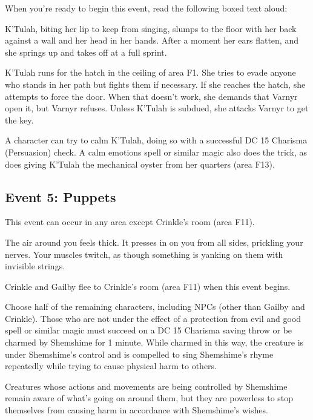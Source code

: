 \documentclass[10pt,a4paper,twoside,bg=print,twocolumn,openany,nodeprecatedcode]{dndbook}
\begin{document}
When you're ready to begin this event, read the following boxed text aloud:

\begin{DndReadAloud}{}
K'Tulah, biting her lip to keep from singing, slumps to the floor with her back against a wall and her head in her hands. After a moment her ears flatten, and she springs up and takes off at a full sprint.

\end{DndReadAloud}

K'Tulah runs for the hatch in the ceiling of area F1. She tries to evade anyone who stands in her path but fights them if necessary. If she reaches the hatch, she attempts to force the door. When that doesn't work, she demands that Varnyr open it, but Varnyr refuses. Unless K'Tulah is subdued, she attacks Varnyr to get the key.

A character can try to calm K'Tulah, doing so with a successful DC 15 Charisma (Persuasion) check. A calm emotions spell or similar magic also does the trick, as does giving K'Tulah the mechanical oyster from her quarters (area F13).

\subsection{Event 5: Puppets}
This event can occur in any area except Crinkle's room (area F11).

\begin{DndReadAloud}{}
The air around you feels thick. It presses in on you from all sides, prickling your nerves. Your muscles twitch, as though something is yanking on them with invisible strings.

\end{DndReadAloud}

Crinkle and Gailby flee to Crinkle's room (area F11) when this event begins.

Choose half of the remaining characters, including NPCs (other than Gailby and Crinkle). Those who are not under the effect of a protection from evil and good spell or similar magic must succeed on a DC 15 Charisma saving throw or be charmed by Shemshime for 1 minute. While charmed in this way, the creature is under Shemshime's control and is compelled to sing Shemshime's rhyme repeatedly while trying to cause physical harm to others.

Creatures whose actions and movements are being controlled by Shemshime remain aware of what's going on around them, but they are powerless to stop themselves from causing harm in accordance with Shemshime's wishes.
\end{document}
